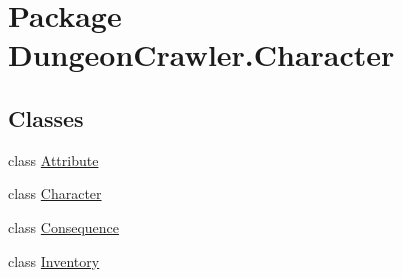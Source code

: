 \hypertarget{namespace_dungeon_crawler_1_1_character}{}\section{Package Dungeon\+Crawler.\+Character}
\label{namespace_dungeon_crawler_1_1_character}
\subsection*{Classes}
\begin{DoxyCompactItemize}
\item 
class \hyperlink{class_dungeon_crawler_1_1_character_1_1_attribute}{Attribute}
\item 
class \hyperlink{class_dungeon_crawler_1_1_character_1_1_character}{Character}
\item 
class \hyperlink{class_dungeon_crawler_1_1_character_1_1_consequence}{Consequence}
\item 
class \hyperlink{class_dungeon_crawler_1_1_character_1_1_inventory}{Inventory}
\end{DoxyCompactItemize}
